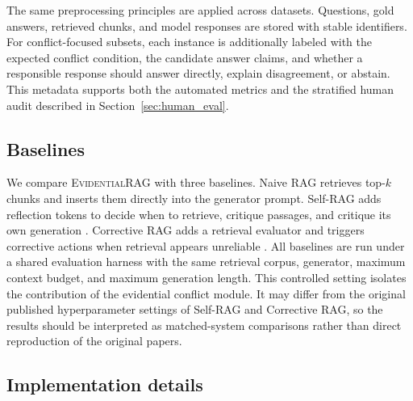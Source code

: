 \documentclass[preprint,12pt,authoryear,nopreprintline]{elsarticle}
\newcommand{\ERAG}{\textsc{EvidentialRAG}}
\begin{document}
The same preprocessing principles are applied across datasets. Questions, gold answers, retrieved chunks, and model responses are stored with stable identifiers. For conflict-focused subsets, each instance is additionally labeled with the expected conflict condition, the candidate answer claims, and whether a responsible response should answer directly, explain disagreement, or abstain. This metadata supports both the automated metrics and the stratified human audit described in Section~\ref{sec:human_eval}.

\subsection{Baselines}

We compare \ERAG{} with three baselines. Naive RAG retrieves top-$k$ chunks and inserts them directly into the generator prompt. Self-RAG adds reflection tokens to decide when to retrieve, critique passages, and critique its own generation \citep{Asai2024SelfRAG}. Corrective RAG adds a retrieval evaluator and triggers corrective actions when retrieval appears unreliable \citep{Yan2024CRAG}. All baselines are run under a shared evaluation harness with the same retrieval corpus, generator, maximum context budget, and maximum generation length. This controlled setting isolates the contribution of the evidential conflict module. It may differ from the original published hyperparameter settings of Self-RAG and Corrective RAG, so the results should be interpreted as matched-system comparisons rather than direct reproduction of the original papers.

\subsection{Implementation details}
\end{document}
